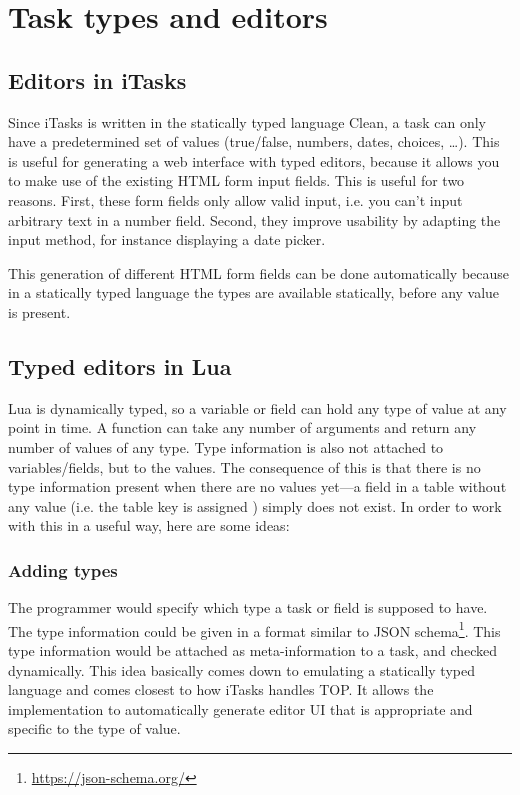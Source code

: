 \section{Task types and editors}\label{section-editors}


\subsection{Editors in iTasks}
Since iTasks is written in the statically typed language Clean, a task can only have a predetermined set of values (true/false, numbers, dates, choices, \dots). This is useful for generating a web interface with typed editors, because it allows you to make use of the existing HTML form input fields. This is useful for two reasons. First, these form fields only allow valid input, i.e. you can't input arbitrary text in a number field. Second, they improve usability by adapting the input method, for instance displaying a date picker.

This generation of different HTML form fields can be done automatically because in a statically typed language the types are available statically, before any value is present.

\subsection{Typed editors in Lua}\label{section-editors-lua}
Lua is dynamically typed, so a variable or field can hold any type of value at any point in time. A function can take any number of arguments and return any number of values of any type. Type information is also not attached to variables/fields, but to the values. The consequence of this is that there is no type information present when there are no values yet---a field in a table without any value (i.e. the table key is assigned ) simply does not exist. In order to work with this in a useful way, here are some ideas:

\subsubsection{Adding types}
The programmer would specify which type a task or field is supposed to have. The type information could be given in a format similar to JSON schema\footnote{\label{footnote-json-schema}\url{https://json-schema.org/}}. This type information would be attached as meta-information to a task, and checked dynamically. This idea basically comes down to emulating a statically typed language and comes closest to how iTasks handles TOP. It allows the implementation to automatically generate editor UI that is appropriate and specific to the type of value.

